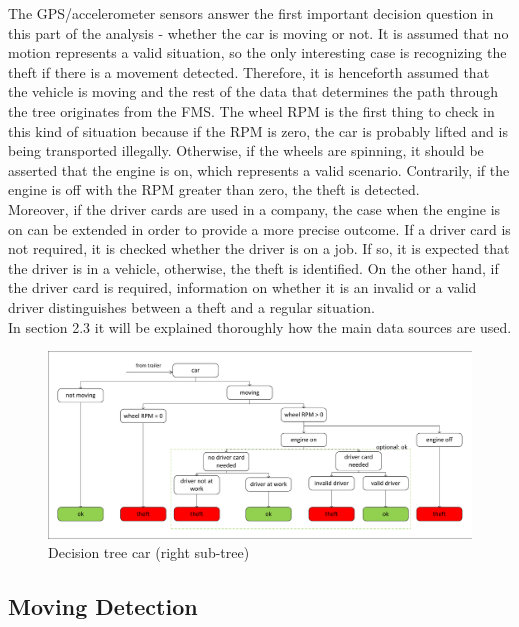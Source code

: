 The GPS/accelerometer sensors answer the first important decision question in this part of the analysis - whether the car is moving or not. It is assumed that no motion represents a valid situation, so the only interesting case is recognizing the theft if there is a movement detected. Therefore, it is henceforth assumed that the vehicle is moving and the rest of the data that determines the path through the tree originates from the FMS. The wheel RPM is the first thing to check in this kind of situation because if the RPM is zero, the car is probably lifted and is being transported illegally. Otherwise, if the wheels are spinning, it should be asserted that the engine is on, which represents a valid scenario. Contrarily, if the engine is off with the RPM greater than zero, the theft is detected.\\
Moreover, if the driver cards are used in a company, the case when the engine is on can be extended in order to provide a more precise outcome. If a driver card is not required, it is checked whether the driver is on a job. If so, it is expected that the driver is in a vehicle, otherwise, the theft is identified. On the other hand, if the driver card is required, information on whether it is an invalid or a valid driver distinguishes between a theft and a regular situation. \\
In section 2.3 it will be explained thoroughly how the main data sources are used.

\begin{figure} [h]
    \includegraphics[clip, trim=0.1cm 0.1cm 0.1cm 0.1cm, width=1\textwidth]{src/pic/DecisionTreeCar}
    \caption{Decision tree car (right sub-tree)}
    \label{fig::decisionTreeCar}
\end{figure}

\subsection{Moving Detection}

